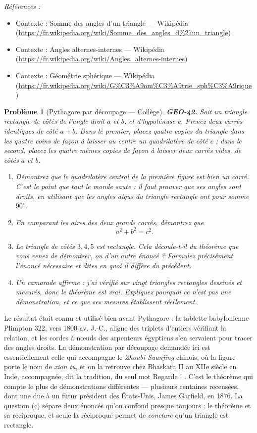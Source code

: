 \documentclass[11pt]{article}
\newtheorem{problem}{Problème}
\newenvironment{refs}{\par\small\noindent\emph{Références :}\begin{itemize}\setlength\itemsep{0pt}}{\end{itemize}\normalsize}
\begin{document}
\begin{refs}
\item Contexte : Somme des angles d'un triangle --- Wikipédia (\url{https://fr.wikipedia.org/wiki/Somme_des_angles_d%27un_triangle})
\item Contexte : Angles alternes-internes --- Wikipédia (\url{https://fr.wikipedia.org/wiki/Angles_alternes-internes})
\item Contexte : Géométrie sphérique --- Wikipédia (\url{https://fr.wikipedia.org/wiki/G%C3%A9om%C3%A9trie_sph%C3%A9rique})
\end{refs}

\bigskip

\begin{problem}[{Pythagore par découpage --- Collège}]
\textbf{GEO-42.} Soit un triangle rectangle de côtés de l'angle droit $ a $ et $ b $, et
d'hypoténuse $ c $. Prenez deux carrés identiques de côté $ a + b $. Dans le premier, placez
quatre copies du triangle dans les quatre coins de façon à laisser au centre un quadrilatère de côté
$ c $ ; dans le second, placez les quatre mêmes copies de façon à laisser deux carrés vides, de
côtés $ a $ et $ b $.
\begin{enumerate}
\item[(a)] Démontrez que le quadrilatère central de la première figure est bien un carré. C'est le point que
tout le monde saute : il faut prouver que ses angles sont droits, en utilisant que les angles aigus du
triangle rectangle ont pour somme $ 90^\circ $.
\item[(b)] En comparant les aires des deux grands carrés, démontrez que
\[ a^2 + b^2 = c^2 . \]
\item[(c)] Le triangle de côtés $ 3, 4, 5 $ est rectangle. Cela découle-t-il du théorème que vous venez de
démontrer, ou d'un autre énoncé ? Formulez précisément l'énoncé nécessaire et dites en quoi il diffère
du précédent.
\item[(d)] Un camarade affirme : \og{} j'ai vérifié sur vingt triangles rectangles dessinés et mesurés, donc le
théorème est vrai. \fg{} Expliquez pourquoi ce n'est pas une démonstration, et ce que ses mesures
établissent réellement.
\end{enumerate}

\end{problem}

\noindent Le résultat était connu et utilisé bien avant Pythagore : la tablette babylonienne
Plimpton 322, vers 1800 av. J.-C., aligne des triplets d'entiers vérifiant la relation, et les cordes
à n\oe{}uds des arpenteurs égyptiens s'en servaient pour tracer des angles droits. La démonstration par
découpage demandée ici est essentiellement celle qui accompagne le \textit{Zhoubi Suanjing} chinois, où
la figure porte le nom de \textit{xian tu}, et on la retrouve chez Bh\=askara II au XIIe siècle
en Inde, accompagnée, dit la tradition, du seul mot \og{} Regarde ! \fg{}. C'est le théorème qui compte le
plus de démonstrations différentes --- plusieurs centaines recensées, dont une due à un futur président
des États-Unis, James Garfield, en 1876. La question (c) sépare deux énoncés qu'on confond presque
toujours : le théorème et sa réciproque, et seule la réciproque permet de \textit{conclure} qu'un
triangle est rectangle.
\end{document}
